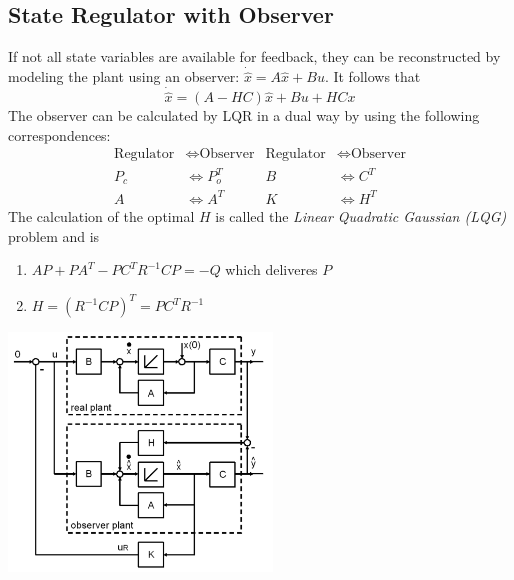 \subsection{State Regulator with Observer}
\begin{minipage}{10cm}
    If not all state variables are available for feedback, they can be reconstructed by modeling the plant
    using an observer: $\dot{\hat{x}} = A\hat{x} + Bu$.
    It follows that
    \[
        \dot{\hat{x}} = (A-HC) \hat{x} + Bu + HCx
    \]
    The observer can be calculated by LQR in a dual way by using the following correspondences:
    \begin{align*}
        \text{Regulator} &\Leftrightarrow \text{Observer} & \text{Regulator} &\Leftrightarrow \text{Observer} \\
        P_c &\Leftrightarrow P_o^T &
        B &\Leftrightarrow C^T \\
        A &\Leftrightarrow A^T &
        K &\Leftrightarrow H^T
    \end{align*}
    The calculation of the optimal $H$ is called the \emph{Linear Quadratic Gaussian (LQG)} problem and is
    \begin{enumerate}
        \item $AP + PA^T - PC^TR^{-1}CP = -Q$ which deliveres $P$
        \item $H = (R^{-1}CP)^T = PC^TR^{-1}$
    \end{enumerate}
    
\end{minipage}
\hspace{0.5cm}
\begin{minipage}{8cm}
    \centering
    \includegraphics[width=7cm]{./bilder/observer.png}
\end{minipage}

